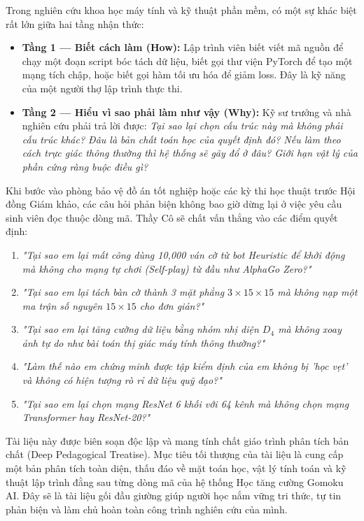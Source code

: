 \documentclass[11pt,a4paper]{report}
\begin{document}
Trong nghiên cứu khoa học máy tính và kỹ thuật phần mềm, có một sự khác biệt rất lớn giữa hai tầng nhận thức:
\begin{itemize}
    \item \textbf{Tầng 1 --- Biết cách làm (How):} Lập trình viên biết viết mã nguồn để chạy một đoạn script bóc tách dữ liệu, biết gọi thư viện PyTorch để tạo một mạng tích chập, hoặc biết gọi hàm tối ưu hóa để giảm loss. Đây là kỹ năng của một người thợ lập trình thực thi.
    \item \textbf{Tầng 2 --- Hiểu vì sao phải làm như vậy (Why):} Kỹ sư trưởng và nhà nghiên cứu phải trả lời được: \textit{Tại sao lại chọn cấu trúc này mà không phải cấu trúc khác? Đâu là bản chất toán học của quyết định đó? Nếu làm theo cách trực giác thông thường thì hệ thống sẽ gãy đổ ở đâu? Giới hạn vật lý của phần cứng ràng buộc điều gì?}
\end{itemize}

Khi bước vào phòng bảo vệ đồ án tốt nghiệp hoặc các kỳ thi học thuật trước Hội đồng Giám khảo, các câu hỏi phản biện không bao giờ dừng lại ở việc yêu cầu sinh viên đọc thuộc dòng mã. Thầy Cô sẽ chất vấn thẳng vào các điểm quyết định:
\begin{enumerate}
    \item \textit{"Tại sao em lại mất công dùng 10,000 ván cờ từ bot Heuristic để khởi động mà không cho mạng tự chơi (Self-play) từ đầu như AlphaGo Zero?"}
    \item \textit{"Tại sao em lại tách bàn cờ thành 3 mặt phẳng $3 \times 15 \times 15$ mà không nạp một ma trận số nguyên $15 \times 15$ cho đơn giản?"}
    \item \textit{"Tại sao em lại tăng cường dữ liệu bằng nhóm nhị diện $D_4$ mà không xoay ảnh tự do như bài toán thị giác máy tính thông thường?"}
    \item \textit{"Làm thế nào em chứng minh được tập kiểm định của em không bị 'học vẹt' và không có hiện tượng rò rỉ dữ liệu quỹ đạo?"}
    \item \textit{"Tại sao em lại chọn mạng ResNet 6 khối với 64 kênh mà không chọn mạng Transformer hay ResNet-20?"}
\end{enumerate}

Tài liệu này được biên soạn độc lập và mang tính chất giáo trình phân tích bản chất (Deep Pedagogical Treatise). Mục tiêu tối thượng của tài liệu là cung cấp một bản phân tích toàn diện, thấu đáo về mặt toán học, vật lý tính toán và kỹ thuật lập trình đằng sau từng dòng mã của hệ thống Học tăng cường Gomoku AI. Đây sẽ là tài liệu gối đầu giường giúp người học nắm vững tri thức, tự tin phản biện và làm chủ hoàn toàn công trình nghiên cứu của mình.
\end{document}
